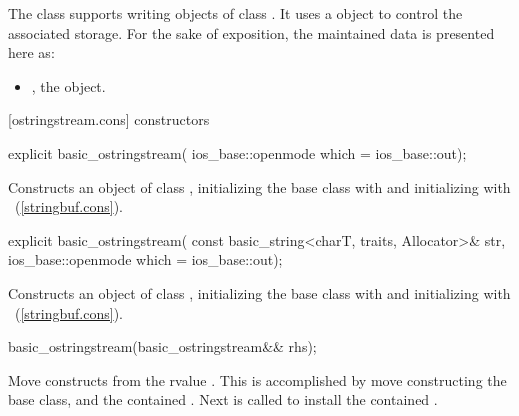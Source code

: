 \pnum
The class
supports writing objects of class
.
It uses a
object to control the associated storage.
For the sake of exposition, the maintained data is presented here as:
\begin{itemize}
\item
{}, the  object.
\end{itemize}

[ostringstream.cons]{ constructors}

%
\begin{itemdecl}
explicit basic_ostringstream(
  ios_base::openmode which = ios_base::out);
\end{itemdecl}

\begin{itemdescr}
\pnum
\effects
Constructs an object of class
,
initializing the base class with
and initializing  with
~(\ref{stringbuf.cons}).
\end{itemdescr}

%
\begin{itemdecl}
explicit basic_ostringstream(
  const basic_string<charT, traits, Allocator>& str,
  ios_base::openmode which = ios_base::out);
\end{itemdecl}

\begin{itemdescr}
\pnum
\effects
Constructs an object of class
,
initializing the base class with
and initializing  with
~(\ref{stringbuf.cons}).
\end{itemdescr}

%
\begin{itemdecl}
basic_ostringstream(basic_ostringstream&& rhs);
\end{itemdecl}

\begin{itemdescr}
\pnum
\effects Move constructs from the rvalue . This
is accomplished by move constructing the base class, and the contained
.
Next  is called to
install the contained .
\end{itemdescr}

